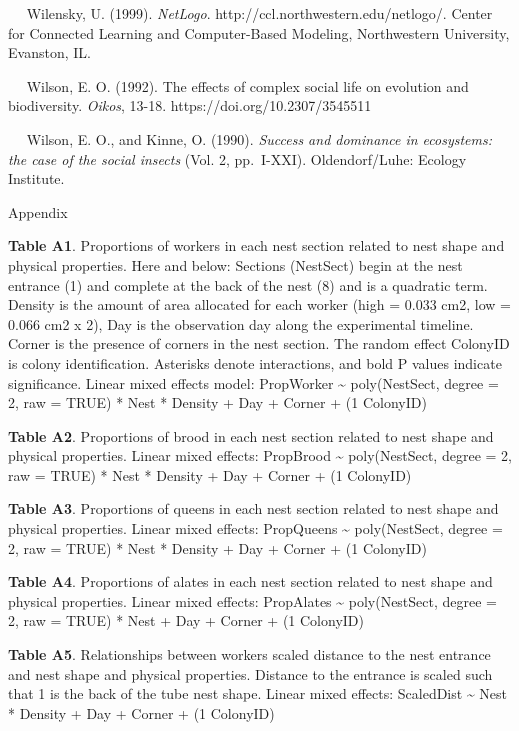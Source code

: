 \documentclass[3p]{elsarticle} %
\begin{document}
~~ Wilensky, U. (1999). \emph{NetLogo}.
http://ccl.northwestern.edu/netlogo/. Center for Connected Learning and
Computer-Based Modeling, Northwestern University, Evanston, IL.

~~ Wilson, E. O. (1992). The effects of complex social life on evolution
and biodiversity. \emph{Oikos}, 13-18. https://doi.org/10.2307/3545511

~~ Wilson, E. O., and Kinne, O. (1990). \emph{Success and dominance in
ecosystems: the case of the social insects} (Vol. 2, pp.~I-XXI).
Oldendorf/Luhe: Ecology Institute.

Appendix

\textbf{Table A1}. Proportions of workers in each nest section related
to nest shape and physical properties. Here and below: Sections
(NestSect) begin at the nest entrance (1) and complete at the back of
the nest (8) and is a quadratic term. Density is the amount of area
allocated for each worker (high = 0.033 cm2, low = 0.066 cm2 x 2), Day
is the observation day along the experimental timeline. Corner is the
presence of corners in the nest section. The random effect ColonyID is
colony identification. Asterisks denote interactions, and bold P values
indicate significance. Linear mixed effects model: PropWorker
\textasciitilde{} poly(NestSect, degree = 2, raw = TRUE) * Nest *
Density + Day + Corner + (1 \textbar{} ColonyID)

\textbf{Table A2}. Proportions of brood in each nest section related to
nest shape and physical properties. Linear mixed effects: PropBrood
\textasciitilde{} poly(NestSect, degree = 2, raw = TRUE) * Nest *
Density + Day + Corner + (1 \textbar{} ColonyID)

\textbf{Table A3}. Proportions of queens in each nest section related to
nest shape and physical properties. Linear mixed effects: PropQueens
\textasciitilde{} poly(NestSect, degree = 2, raw = TRUE) * Nest *
Density + Day + Corner + (1 \textbar{} ColonyID)

\textbf{Table A4}. Proportions of alates in each nest section related to
nest shape and physical properties. Linear mixed effects: PropAlates
\textasciitilde{} poly(NestSect, degree = 2, raw = TRUE) * Nest + Day +
Corner + (1 \textbar{} ColonyID)

\textbf{Table A5}. Relationships between workers scaled distance to the
nest entrance and nest shape and physical properties. Distance to the
entrance is scaled such that 1 is the back of the tube nest shape.
Linear mixed effects: ScaledDist \textasciitilde{} Nest * Density + Day
+ Corner + (1 \textbar{} ColonyID)
\end{document}
